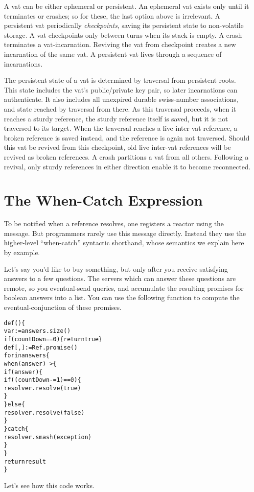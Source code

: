 \documentclass{llncs}
\begin{document}
A vat can be either ephemeral or persistent. An ephemeral vat exists
only until it terminates or crashes; so for these, the last option
above is irrelevant. A persistent vat periodically \emph{checkpoints},
saving its persistent state to non-volatile storage. A vat checkpoints
only between turns when its stack is empty. A crash terminates a
vat-incarnation. Reviving the vat from checkpoint creates a new
incarnation of the same vat. A persistent vat lives through a sequence
of incarnations.

The persistent state of a vat is determined by traversal from
persistent roots. This state includes the vat's public/private key
pair, so later incarnations can authenticate. It also includes all
unexpired durable swiss-number associations, and state reached by
traversal from there. As this traversal proceeds, when it reaches a
sturdy reference, the sturdy reference itself is saved, but it is not
traversed to its target. When the traversal reaches a live inter-vat
reference, a broken reference is saved instead, and the reference is
again not traversed. Should this vat be revived from this checkpoint,
old live inter-vat references will be revived as broken references. A
crash partitions a vat from all others. Following a revival, only
sturdy references in either direction enable it to become reconnected.

\section{The When-Catch Expression}

To be notified when a reference resolves, one registers a reactor
using the  message. But programmers rarely
use this message directly. Instead they use the higher-level
``when-catch'' syntactic shorthand, whose semantics we explain here by
example.

Let's say you'd like to buy something, but only after you receive
satisfying answers to a few questions. The servers which can answer
these questions are remote, so you eventual-send queries, and
accumulate the resulting promises for boolean answers into a list. You
can use the following  function to compute the
eventual-conjunction of these promises.
%
\begin{alltt}
    def () \{
        var  := answers.size()
        if (countDown == 0) \{ return true \}
        def [, ] := Ref.promise()
        for  in answers \{
            when (answer) -> \{
                if (answer) \{
                    if ((countDown -= 1) == 0) \{
                        resolver.resolve(true) 
                    \}
                \} else \{
                    resolver.resolve(false)
                \}
            \} catch  \{
                resolver.smash(exception)
            \}
        \}
        return result
    \}
\end{alltt}
%
Let's see how this code works.
\end{document}
